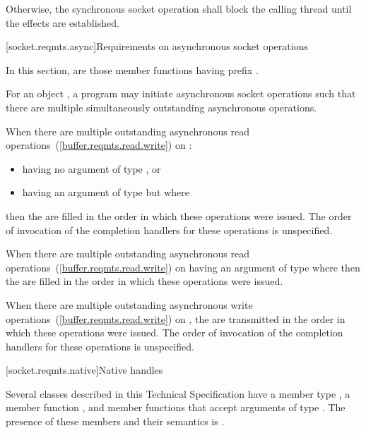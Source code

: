 \pnum
Otherwise, the synchronous socket operation shall block the calling thread until the effects are established.



[socket.reqmts.async]{Requirements on asynchronous socket operations}

\pnum
In this section,  are those member functions having prefix .

\pnum
For an object , a program may initiate asynchronous socket operations such that there are multiple simultaneously outstanding asynchronous operations.

\pnum
When there are multiple outstanding asynchronous read operations~(\ref{buffer.reqmts.read.write}) on :

\begin{itemize}
\item
having no argument  of type , or
\item
having an argument  of type  but where 
\end{itemize}

then the  are filled in the order in which these operations were issued. The order of invocation of the completion handlers for these operations is unspecified.

\pnum
When there are multiple outstanding asynchronous read operations~(\ref{buffer.reqmts.read.write}) on  having an argument  of type  where  then the  are filled in the order in which these operations were issued.

\pnum
When there are multiple outstanding asynchronous write operations~(\ref{buffer.reqmts.read.write}) on , the  are transmitted in the order in which these operations were issued. The order of invocation of the completion handlers for these operations is unspecified.



%
[socket.reqmts.native]{Native handles}

\pnum
Several classes described in this Technical Specification have a member type , a member function , and member functions that accept arguments of type . The presence of these members and their semantics is
.

